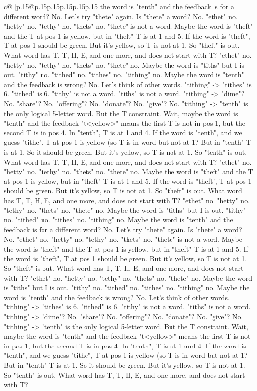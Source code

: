 \documentclass{article}
\begin{document}
{\begin{supertabular}{c@{$\;$}|p{.15\linewidth}@{}p{.15\linewidth}p{.15\linewidth}p{.15\linewidth}p{.15\linewidth}p{.15\linewidth}}
{{{the word is "tenth" and the feedback is for a different word? No. Let's try "thete" again. Is "thete" a word? No. "ethet" no. "hetty" no. "tethy" no. "thets" no. "thete" is not a word. Maybe the word is "theft" and the T at pos 1 is yellow, but in "theft" T is at 1 and 5. If the word is "theft", T at pos 1 should be green. But it's yellow, so T is not at 1. So "theft" is out. What word has T, T, H, E, and one more, and does not start with T? "ethet" no. "hetty" no. "tethy" no. "thets" no. "thete" no. Maybe the word is "tiths" but I is out. "tithy" no. "tithed" no. "tithes" no. "tithing" no. Maybe the word is "tenth" and the feedback is wrong? No. Let's think of other words. "tithing" {-}> "tithes" is 6. "tithed" is 6. "tithy" is not a word. "tiths" is not a word. "tithing" {-}> "dime"? No. "share"? No. "offering"? No. "donate"? No. "give"? No. "tithing" {-}> "tenth" is the only logical 5{-}letter word. But the T constraint. Wait, maybe the word is "tenth" and the feedback "t<yellow>" means the first T is not in pos 1, but the second T is in pos 4. In "tenth", T is at 1 and 4. If the word is "tenth", and we guess "tithe", T at pos 1 is yellow (so T is in word but not at 1? But in "tenth" T is at 1. So it should be green. But it's yellow, so T is not at 1. So "tenth" is out. What word has T, T, H, E, and one more, and does not start with T? "ethet" no. "hetty" no. "tethy" no. "thets" no. "thete" no. Maybe the word is "theft" and the T at pos 1 is yellow, but in "theft" T is at 1 and 5. If the word is "theft", T at pos 1 should be green. But it's yellow, so T is not at 1. So "theft" is out. What word has T, T, H, E, and one more, and does not start with T? "ethet" no. "hetty" no. "tethy" no. "thets" no. "thete" no. Maybe the word is "tiths" but I is out. "tithy" no. "tithed" no. "tithes" no. "tithing" no. Maybe the word is "tenth" and the feedback is for a different word? No. Let's try "thete" again. Is "thete" a word? No. "ethet" no. "hetty" no. "tethy" no. "thets" no. "thete" is not a word. Maybe the word is "theft" and the T at pos 1 is yellow, but in "theft" T is at 1 and 5. If the word is "theft", T at pos 1 should be green. But it's yellow, so T is not at 1. So "theft" is out. What word has T, T, H, E, and one more, and does not start with T? "ethet" no. "hetty" no. "tethy" no. "thets" no. "thete" no. Maybe the word is "tiths" but I is out. "tithy" no. "tithed" no. "tithes" no. "tithing" no. Maybe the word is "tenth" and the feedback is wrong? No. Let's think of other words. "tithing" {-}> "tithes" is 6. "tithed" is 6. "tithy" is not a word. "tiths" is not a word. "tithing" {-}> "dime"? No. "share"? No. "offering"? No. "donate"? No. "give"? No. "tithing" {-}> "tenth" is the only logical 5{-}letter word. But the T constraint. Wait, maybe the word is "tenth" and the feedback "t<yellow>" means the first T is not in pos 1, but the second T is in pos 4. In "tenth", T is at 1 and 4. If the word is "tenth", and we guess "tithe", T at pos 1 is yellow (so T is in word but not at 1? But in "tenth" T is at 1. So it should be green. But it's yellow, so T is not at 1. So "tenth" is out. What word has T, T, H, E, and one more, and does not start with T? }}}
\end{supertabular}}
\end{document}
